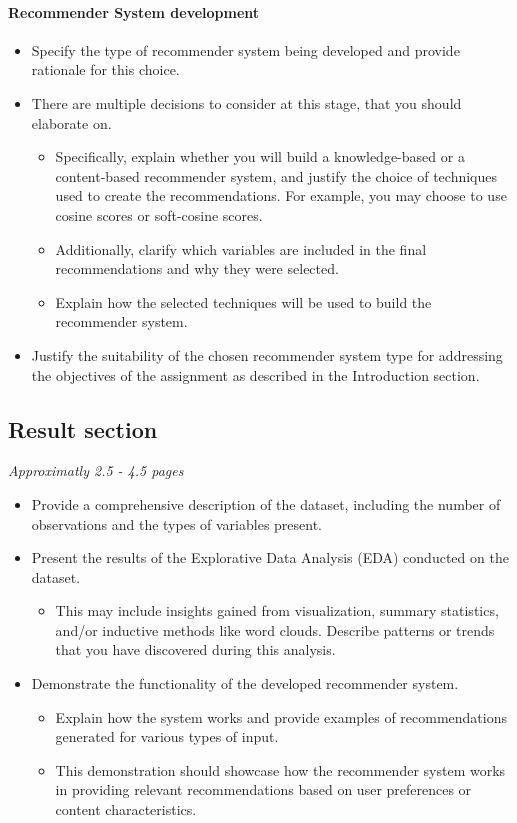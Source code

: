 \paragraph{Recommender System development}
\begin{itemize}
\item Specify the type of recommender system being developed and provide rationale for this choice. 
\item There are multiple decisions to consider at this stage, that you should elaborate on. 
\begin{itemize}
\item Specifically, explain whether you will build a knowledge-based or a content-based recommender system, and justify the choice of techniques used to create the recommendations. For example, you may choose to use cosine scores or soft-cosine scores.
\item Additionally, clarify which variables are included in the final recommendations and why they were selected.
\item Explain how the selected techniques will be used to build the recommender system.
\end{itemize}
\item Justify the suitability of the chosen recommender system type for addressing the objectives of the assignment as described in the Introduction section. 
\end{itemize}

\subsection{Result section}
\textit{Approximatly 2.5 - 4.5 pages}

\begin{itemize}
\item Provide a comprehensive description of the dataset, including the number of observations and the types of variables present.
\item Present the results of the Explorative Data Analysis (EDA) conducted on the dataset. 
\begin{itemize}
	\item This may include insights gained from visualization, summary statistics, and/or inductive methods like word clouds. Describe patterns or trends that you have discovered during this analysis.
\end{itemize}
\item Demonstrate the functionality of the developed recommender system. 
\begin{itemize}
\item Explain how the system works and provide examples of recommendations generated for various types of input. 
\item This demonstration should showcase how the recommender system works in providing relevant recommendations based on user preferences or content characteristics.
\end{itemize}
\end{itemize}

